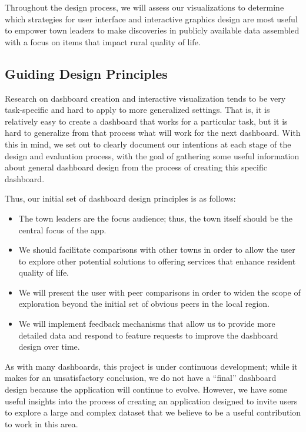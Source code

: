 \documentclass[print]{nuthesis}
\begin{document}
Throughout the design process, we will assess our visualizations to determine which strategies for user interface and interactive graphics design are most useful to empower town leaders to make discoveries in publicly available data assembled with a focus on items that impact rural quality of life.

\hypertarget{guiding-design-principles-1}{%
\subsection{Guiding Design Principles}\label{guiding-design-principles-1}}

Research on dashboard creation and interactive visualization tends to be very task-specific and hard to apply to more generalized settings. That is, it is relatively easy to create a dashboard that works for a particular task, but it is hard to generalize from that process what will work for the next dashboard. With this in mind, we set out to clearly document our intentions at each stage of the design and evaluation process, with the goal of gathering some useful information about general dashboard design from the process of creating this specific dashboard.

Thus, our initial set of dashboard design principles is as follows:

\begin{itemize}
\item The town leaders are the focus audience; thus, the town itself should be the central focus of the app.
\item We should facilitate comparisons with other towns in order to allow the user to explore other potential solutions to offering services that enhance resident quality of life.
\item We will present the user with peer comparisons in order to widen the scope of exploration beyond the initial set of obvious peers in the local region.
\item We will implement feedback mechanisms that allow us to provide more detailed data and respond to feature requests to improve the dashboard design over time.
\end{itemize}

As with many dashboards, this project is under continuous development; while it makes for an unsatisfactory conclusion, we do not have a ``final'' dashboard design because the application will continue to evolve. However, we have some useful insights into the process of creating an application designed to invite users to explore a large and complex dataset that we believe to be a useful contribution to work in this area.
\end{document}
